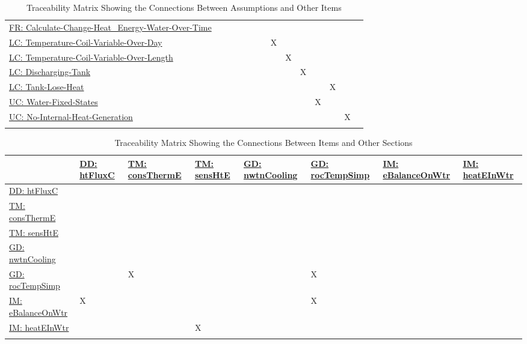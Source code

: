 \documentclass[12pt]{article}
\begin{document}
\begin{longtable}{l l l l l l l l l l l l l l}
\\
\hyperref[calcChgHeatEnergyWtrOverTime]{FR: Calculate-Change-Heat\_Energy-Water-Over-Time} &  &  &  &  &  &  &  &  &  &  &  &  & 
\\
\hyperref[likeChgTCVOD]{LC: Temperature-Coil-Variable-Over-Day} &  &  &  &  &  &  & X &  &  &  &  &  & 
\\
\hyperref[likeChgTCVOL]{LC: Temperature-Coil-Variable-Over-Length} &  &  &  &  &  &  &  & X &  &  &  &  & 
\\
\hyperref[likeChgDT]{LC: Discharging-Tank} &  &  &  &  &  &  &  &  & X &  &  &  & 
\\
\hyperref[likeChgTLH]{LC: Tank-Lose-Heat} &  &  &  &  &  &  &  &  &  &  & X &  & 
\\
\hyperref[unlikeChgWFS]{UC: Water-Fixed-States} &  &  &  &  &  &  &  &  &  & X &  &  & 
\\
\hyperref[unlikeChgNIHG]{UC: No-Internal-Heat-Generation} &  &  &  &  &  &  &  &  &  &  &  & X & 
\\
\bottomrule
\caption{Traceability Matrix Showing the Connections Between Assumptions and Other Items}
\label{Table:TraceMatAvsAll}
\end{longtable}
\begin{longtable}{l l l l l l l l}
\toprule
\textbf{} & \textbf{\hyperref[DD:htFluxC]{DD: htFluxC}} & \textbf{\hyperref[TM:consThermE]{TM: consThermE}} & \textbf{\hyperref[TM:sensHtE]{TM: sensHtE}} & \textbf{\hyperref[GD:nwtnCooling]{GD: nwtnCooling}} & \textbf{\hyperref[GD:rocTempSimp]{GD: rocTempSimp}} & \textbf{\hyperref[IM:eBalanceOnWtr]{IM: eBalanceOnWtr}} & \textbf{\hyperref[IM:heatEInWtr]{IM: heatEInWtr}}
\\
\midrule
\endhead
\hyperref[DD:htFluxC]{DD: htFluxC} &  &  &  &  &  &  & 
\\
\hyperref[TM:consThermE]{TM: consThermE} &  &  &  &  &  &  & 
\\
\hyperref[TM:sensHtE]{TM: sensHtE} &  &  &  &  &  &  & 
\\
\hyperref[GD:nwtnCooling]{GD: nwtnCooling} &  &  &  &  &  &  & 
\\
\hyperref[GD:rocTempSimp]{GD: rocTempSimp} &  & X &  &  & X &  & 
\\
\hyperref[IM:eBalanceOnWtr]{IM: eBalanceOnWtr} & X &  &  &  & X &  & 
\\
\hyperref[IM:heatEInWtr]{IM: heatEInWtr} &  &  & X &  &  &  & 
\\
\bottomrule
\caption{Traceability Matrix Showing the Connections Between Items and Other Sections}
\label{Table:TraceMatRefvsRef}
\end{longtable}
\end{document}
